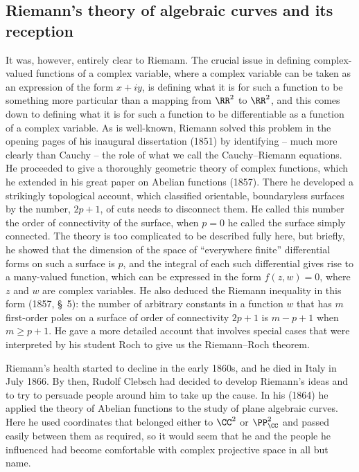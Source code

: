 \subsection{Riemann's theory of algebraic curves and its reception}
It was, however, entirely clear to Riemann. The crucial issue in defining complex-valued functions of a complex variable, where a complex variable can be taken as an expression of the form $x+ iy$, is defining what it is for such a function to be something more particular than a mapping from $\RR^2$ to $\RR^2$, and this comes down to defining what it is for such a function to be differentiable as a function of a complex variable. As is well-known, Riemann solved this problem in the opening pages of his inaugural dissertation  (1851) by identifying -- much more clearly than Cauchy -- the role of what we call the Cauchy--Riemann equations. He proceeded to give a thoroughly geometric theory of complex functions, which he extended in his great paper on Abelian functions (1857). There he developed a strikingly topological account, which classified orientable, boundaryless surfaces by the number, $2p+1$, of cuts needs to disconnect them. He called this number the order of connectivity of the surface, when $p=0$ he called the surface simply connected. The theory is too complicated to be described fully here, but briefly, he showed that  the dimension of the space of ``everywhere finite'' differential forms on such a surface is $p$, and the integral of each such 
differential gives rise to a many-valued function, which can be expressed in the form $f(z, w) = 0$, where $z$ and $w$ are complex variables. He also deduced the Riemann inequality in this form (1857, \S\, 5):  the number of arbitrary constants in a function $w$ that has $m$ first-order poles on a surface of order of connectivity $2p+1$ is $m- p + 1$ when $m \geq p + 1$. He gave a more detailed account that involves special cases that were interpreted by his student Roch to give us the Riemann--Roch theorem. 

Riemann's health started to decline in the early 1860s, and he  died in Italy in July 1866. By then, Rudolf Clebsch had decided to develop Riemann's ideas and to try to persuade people around him to take up the cause. In his (1864) he  applied the theory of Abelian functions to the study of plane algebraic curves. Here he used coordinates that belonged  either to $\CC^2$ or $\PP_{\CC}^2$ and  passed easily between them as required, so it would seem that he and the people he influenced had become comfortable with complex projective space in all but name.

